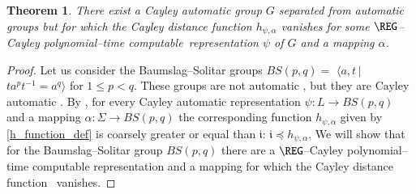 \documentclass[article,12pt]{elsarticle}
\newtheorem{theorem}{Theorem}
\newcommand\distfun{Cayley distance function}
\newcommand\polyC{Cayley polynomial--time computable}
\begin{document}
 \begin{theorem} 
 \label{baumslagthm}	
 	There exist a Cayley automatic group $G$ separated 
 	from automatic groups but for which the Cayley 
 	distance function $h_{\psi,\alpha}$ vanishes 
 	for some $\REG$--\polyC\ representation $\psi$ 
 	of $G$ and a mapping $\alpha$. 
 \end{theorem}
 \begin{proof}     
 	Let us consider the Baumslag--Solitar 
 	groups $BS(p,q) =$ 
 	$\langle a,t \,|$ $t a^p t^{-1}  = a^q \rangle$
 	for $1 \leqslant p < q$. 
 	These groups are not automatic \cite{Epsteinbook}, but
 	they are Cayley automatic  
 	\cite{KKM11,dlt14}. 
 	By \cite[Corollary~2.4]{eastwest19}, for every 
 	Cayley automatic representation 
 	$\psi : L \rightarrow BS(p,q)$ and 
 	a mapping $\alpha: \Sigma  \rightarrow BS(p,q)$ 
 	the corresponding function $h_{\psi,\alpha}$ 
 	given by \eqref{h_function_def} 
 	is coarsely greater or equal than $\mathfrak{i}$: 
 	$\mathfrak{i} \preceq h_{\psi,\alpha}$. 
 	We will show that for the Baumslag--Solitar group   
 	$BS(p,q)$ there are  
 	a $\REG$--Cayley polynomial--time 
 	computable representation %
 	and a mapping %
 	for which the \distfun\  
 	vanishes.   
 	

\end{proof}
\end{document}
